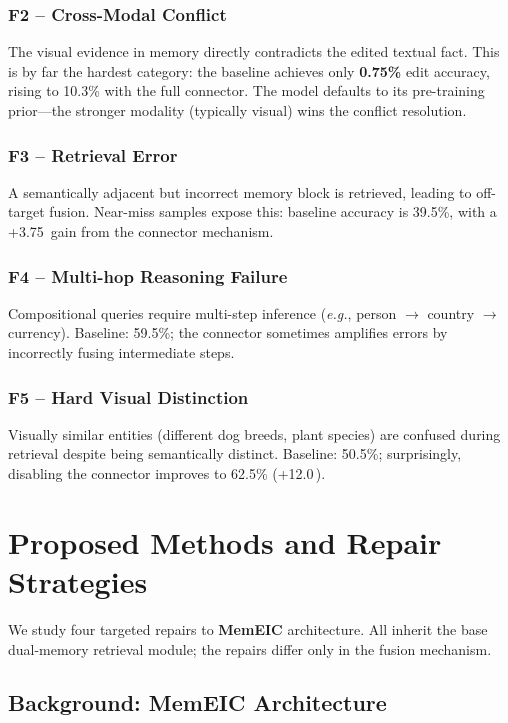 \documentclass[11pt]{article}
\newcommand{\eg}{\textit{e.g.}}
\newcommand{\memeic}{\textbf{MemEIC}}
\newcommand{\pp}{\,\text{pp}}
\begin{document}
\subsubsection{F2 -- Cross-Modal Conflict}
The visual evidence in memory directly contradicts the edited textual fact.
This is by far the hardest category: the baseline achieves only
\textbf{0.75\%} edit accuracy, rising to 10.3\% with the full connector.
The model defaults to its pre-training prior---the stronger modality
(typically visual) wins the conflict resolution.

\subsubsection{F3 -- Retrieval Error}
A semantically adjacent but incorrect memory block is retrieved, leading to
off-target fusion. Near-miss samples expose this: baseline accuracy is
39.5\%, with a +3.75\pp{} gain from the connector mechanism.

\subsubsection{F4 -- Multi-hop Reasoning Failure}
Compositional queries require multi-step inference (\eg, person $\to$ country
$\to$ currency). Baseline: 59.5\%; the connector sometimes amplifies errors by
incorrectly fusing intermediate steps.

\subsubsection{F5 -- Hard Visual Distinction}
Visually similar entities (different dog breeds, plant species) are confused
during retrieval despite being semantically distinct. Baseline: 50.5\%;
surprisingly, disabling the connector improves to 62.5\% (+12.0\pp{}).

\section{Proposed Methods and Repair Strategies}
\label{sec:methods}

We study four targeted repairs to \memeic{} architecture. All inherit the base
dual-memory retrieval module; the repairs differ only in the fusion mechanism.

\subsection{Background: MemEIC Architecture}
\label{sec:memeic_bg}
\end{document}
